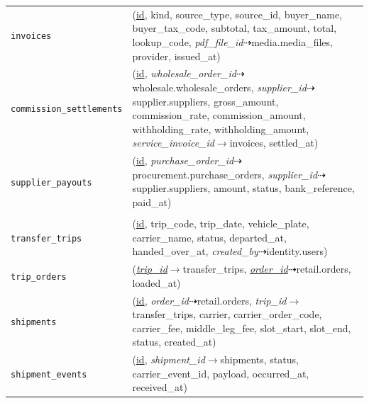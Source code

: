 \begin{longtable}{L{3.10cm} L{11.90cm}}
\texttt{invoices} & (\underline{id}, kind, source\_\allowbreak{}type, source\_\allowbreak{}id, buyer\_\allowbreak{}name, buyer\_\allowbreak{}tax\_\allowbreak{}code, subtotal, tax\_\allowbreak{}amount, total, lookup\_\allowbreak{}code, \textit{pdf\_\allowbreak{}file\_\allowbreak{}id}$\dashrightarrow$media.media\_\allowbreak{}files, provider, issued\_\allowbreak{}at) \\
\texttt{commission\_\allowbreak{}settlements} & (\underline{id}, \textit{wholesale\_\allowbreak{}order\_\allowbreak{}id}$\dashrightarrow$wholesale.wholesale\_\allowbreak{}orders, \textit{supplier\_\allowbreak{}id}$\dashrightarrow$supplier.suppliers, gross\_\allowbreak{}amount, commission\_\allowbreak{}rate, commission\_\allowbreak{}amount, withholding\_\allowbreak{}rate, withholding\_\allowbreak{}amount, \textit{service\_\allowbreak{}invoice\_\allowbreak{}id}$\rightarrow$invoices, settled\_\allowbreak{}at) \\
\texttt{supplier\_\allowbreak{}payouts} & (\underline{id}, \textit{purchase\_\allowbreak{}order\_\allowbreak{}id}$\dashrightarrow$procurement.purchase\_\allowbreak{}orders, \textit{supplier\_\allowbreak{}id}$\dashrightarrow$supplier.suppliers, amount, status, bank\_\allowbreak{}reference, paid\_\allowbreak{}at) \\
 \\
\texttt{transfer\_\allowbreak{}trips} & (\underline{id}, trip\_\allowbreak{}code, trip\_\allowbreak{}date, vehicle\_\allowbreak{}plate, carrier\_\allowbreak{}name, status, departed\_\allowbreak{}at, handed\_\allowbreak{}over\_\allowbreak{}at, \textit{created\_\allowbreak{}by}$\dashrightarrow$identity.users) \\
\texttt{trip\_\allowbreak{}orders} & (\textit{\underline{trip\_\allowbreak{}id}}$\rightarrow$transfer\_\allowbreak{}trips, \textit{\underline{order\_\allowbreak{}id}}$\dashrightarrow$retail.orders, loaded\_\allowbreak{}at) \\
\texttt{shipments} & (\underline{id}, \textit{order\_\allowbreak{}id}$\dashrightarrow$retail.orders, \textit{trip\_\allowbreak{}id}$\rightarrow$transfer\_\allowbreak{}trips, carrier, carrier\_\allowbreak{}order\_\allowbreak{}code, carrier\_\allowbreak{}fee, middle\_\allowbreak{}leg\_\allowbreak{}fee, slot\_\allowbreak{}start, slot\_\allowbreak{}end, status, created\_\allowbreak{}at) \\
\texttt{shipment\_\allowbreak{}events} & (\underline{id}, \textit{shipment\_\allowbreak{}id}$\rightarrow$shipments, status, carrier\_\allowbreak{}event\_\allowbreak{}id, payload, occurred\_\allowbreak{}at, received\_\allowbreak{}at) \\

\end{longtable}
